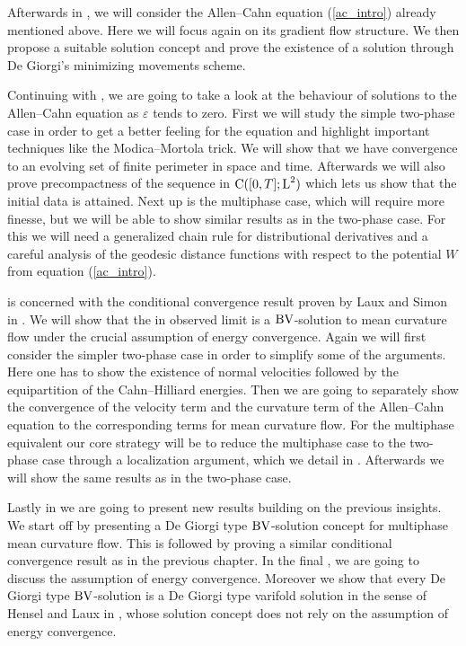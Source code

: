 Afterwards in , we will consider the Allen--Cahn 
equation 
(\ref{ac_intro}) already mentioned above. Here we will focus again on its 
gradient flow structure. We then propose a suitable solution concept and prove 
the existence of a solution through De Giorgi's minimizing movements scheme.

Continuing with , we are going 
to take a look at the behaviour of solutions to the Allen--Cahn equation as $ 
\varepsilon $ tends to zero. First we will study the simple two-phase case in 
order 
to get a better feeling for the equation and highlight important techniques 
like the Modica--Mortola trick. We will show that we have convergence to an 
evolving set of finite perimeter in space and time. 
Afterwards we will also prove 
precompactness of the sequence in $ \operatorname{C} ( [ 0 , T ] ; \operatorname{L}^{ 2 } ) $ which 
lets us show that the initial data is attained. Next up is the multiphase case, 
which will require more finesse, but we will be able to show similar results as 
in the 
two-phase case. 
For this we will need a generalized chain rule for distributional 
derivatives and a careful analysis of the geodesic distance functions with 
respect to the potential $ W $ from equation (\ref{ac_intro}).

 is concerned with the conditional 
convergence result proven by Laux and Simon in 
\cite{convergence_of_allen_cahn_equation_to_multiphase_mean_curvature_flow}. 
We will show that the in  
observed limit is a $ \operatorname{BV} $-solution to mean curvature flow under the crucial 
assumption of energy convergence. 
Again we will first consider the simpler two-phase case in 
order to simplify some of the arguments. Here one has to show the existence of 
normal velocities followed by the equipartition of the Cahn--Hilliard energies. 
Then we are going 
to separately show the convergence of the velocity term and the curvature term 
of the Allen--Cahn equation to the corresponding terms for mean curvature flow. 
For the multiphase equivalent our core strategy will be to reduce the 
multiphase case to the two-phase 
case through a localization argument, which we detail in 
. 
Afterwards we will show the same results as in the two-phase case.

Lastly in  we are going to present new results 
building on the previous insights. We start off by presenting a De Giorgi type 
$ \operatorname{BV} $-solution concept for multiphase mean curvature flow. This is followed 
by proving a similar conditional convergence result as in the previous chapter. 
In the final 
, we are going to 
discuss the assumption of energy convergence. Moreover we show that every De 
Giorgi type $ \operatorname{BV} $-solution is a De Giorgi type varifold solution in the sense 
of Hensel and Laux in 
\cite{hensel_laux_varifold_solution_concept_for_mean_curvature_flow}, whose 
solution concept does not rely on the assumption of energy convergence.



